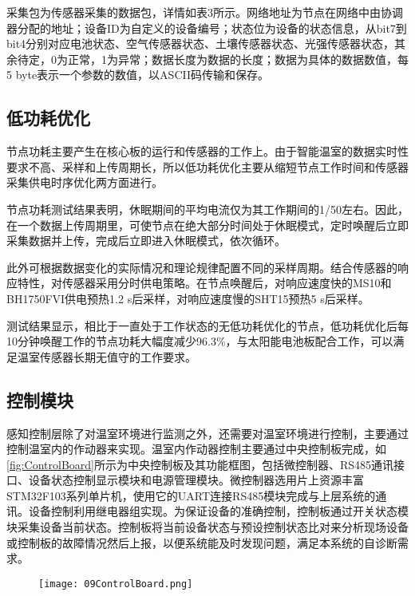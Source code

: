 采集包为传感器采集的数据包，详情如表3所示。网络地址为节点在网络中由协调器分配的地址；设备ID为自定义的设备编号；状态位为设备的状态信息，从bit7到bit4分别对应电池状态、空气传感器状态、土壤传感器状态、光强传感器状态，其余待定，0为正常，1为异常；数据长度为数据的长度；数据为具体的数据数值，每5 byte表示一个参数的数值，以ASCII码传输和保存。

	\subsection{低功耗优化}
	节点功耗主要产生在核心板的运行和传感器的工作上。由于智能温室的数据实时性要求不高、采样和上传周期长，所以低功耗优化主要从缩短节点工作时间和传感器采集供电时序优化两方面进行。
	
节点功耗测试结果表明，休眠期间的平均电流仅为其工作期间的1/50左右。因此，在一个数据上传周期里，可使节点在绝大部分时间处于休眠模式，定时唤醒后立即采集数据并上传，完成后立即进入休眠模式，依次循环。

此外可根据数据变化的实际情况和理论规律配置不同的采样周期。结合传感器的响应特性，对传感器采用分时供电策略。在节点唤醒后，对响应速度快的MS10和BH1750FVI供电预热1.2 s后采样，对响应速度慢的SHT15预热5 s后采样。

测试结果显示，相比于一直处于工作状态的无低功耗优化的节点，低功耗优化后每10分钟唤醒工作的节点功耗大幅度减少96.3\%，与太阳能电池板配合工作，可以满足温室传感器长期无值守的工作要求。

	\subsection{控制模块}
	感知控制层除了对温室环境进行监测之外，还需要对温室环境进行控制，主要通过控制温室内的作动器来实现。温室内作动器控制主要通过中央控制板完成，如\ref{fig:ControlBoard}所示为中央控制板及其功能框图，包括微控制器、RS485通讯接口、设备状态控制显示模块和电源管理模块。微控制器选用片上资源丰富STM32F103系列单片机，使用它的UART连接RS485模块完成与上层系统的通讯。设备控制利用继电器组实现。为保证设备的准确控制，控制板通过开关状态模块采集设备当前状态。控制板将当前设备状态与预设控制状态比对来分析现场设备或控制板的故障情况然后上报，以便系统能及时发现问题，满足本系统的自诊断需求。
	  	\begin{figure}[!htp]
  			\centering
 			\texttt{[image: 09ControlBoard.png]}
		\end{figure}
